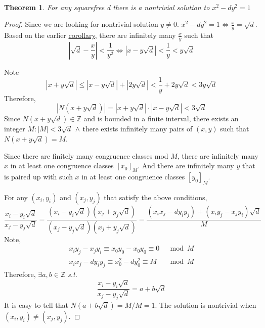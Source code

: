 \documentclass{article}
\newtheorem{thm}{Theorem}
\theoremstyle{definition}\newtheorem{definition}{Definition}
\begin{document}
	\
	\begin{thm}
		For any squarefree d there is a nontrivial solution to $x^2 - d y^2=1$
	\end{thm}
	\begin{proof}
		Since we are looking for nontrivial solution $y\neq 0$. $x^2 - d y^2=1 \iff \frac x y = \sqrt d $. Based on the earlier \hyperref[corollary]{corollary}, there are infinitely many  $\frac { x } { y }$ such that 
		$$\left| \sqrt d - \frac { x } { y } \right| < \frac { 1 } { y ^ { 2 } } \iff 
		\left| x - y\sqrt d \right| < \frac { 1 } {y} < y \sqrt d$$
		
		Note	
		$$
		\left| x + y\sqrt d \right| \leq \left| x - y\sqrt d \right| + |2y \sqrt d| < \frac { 1 } {y}+2y \sqrt d < 3 y \sqrt d
		$$
		Therefore,
		$$
		|N(x + y\sqrt d)| = \left| x + y\sqrt d \right| \cdot \left| x - y\sqrt d \right| <3\sqrt d
		$$
		Since $N(x + y\sqrt d) \in \mathbb Z$ and is bounded in a finite interval, there exists an integer $M : |M|<3\sqrt d \, \land \,$there exists infinitely many pairs of $(x,y)$ such that $N(x + y\sqrt d) = M$.
		
		Since there are finitely many congruence classes mod $M$, there are infinitely many $x$ in at least one congruence classes $[x_0]_M$. And there are infinitely many $y$ that is paired up with such $x$ in at least one congruence classes $[y_0]_M$.
		
		For any $(x_i, y_i)$ and $(x_j, y_j)$ that satisfy the above conditions, 
		$$
		\frac { x _ { i } - y _ { i } \sqrt { d } } { x _ { j } - y _ { j } \sqrt { d } }
		=\frac { (x _ { i } - y _ { i } \sqrt { d }) (x _ { j } + y _ { j } \sqrt { d }) } { (x _ { j } - y _ { j } \sqrt { d }) (x _ { j } + y _ { j } \sqrt { d })}   
		= \frac { \left( x _ { i } x _ { j } - d y _ { i } y _ { j } \right) + \left( x _ { i } y _ { j } - x _ { j } y _ { i } \right) \sqrt { d } } { M }
		$$
		Note,
		\begin{align*}
			 x _ { i } y _ { j } - x _ { j } y _ { i } \equiv x_0y_0-x_0y_0 \equiv 0 &\mod M \\
			 x _ { i } x _ { j } - d y _ { i } y _ { j } \equiv x_0^2-dy_0^2 \equiv M &\mod M
		\end{align*}
		Therefore, $\exists a,b \in \mathbb Z$ \textit{s.t.}
		$$
		\frac { x _ { i } - y _ { i } \sqrt { d } } { x _ { j } - y _ { j } \sqrt { d } } =
		a+b\sqrt { d }
		$$
		It is easy to tell that $N(a+b\sqrt { d })=M/M =1$. The solution is nontrivial when $(x_i, y_i) \neq (x_j, y_j)$.
	\end{proof}
\end{document}
